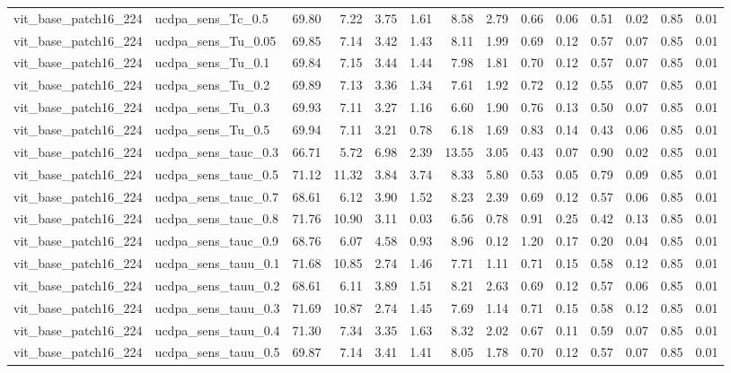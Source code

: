 \begin{tabular}{llrrrrrrrrrrrr}
vit_base_patch16_224 & ucdpa_sens_Tc_0.5 & 69.80 & 7.22 & 3.75 & 1.61 & 8.58 & 2.79 & 0.66 & 0.06 & 0.51 & 0.02 & 0.85 & 0.01 \\
vit_base_patch16_224 & ucdpa_sens_Tu_0.05 & 69.85 & 7.14 & 3.42 & 1.43 & 8.11 & 1.99 & 0.69 & 0.12 & 0.57 & 0.07 & 0.85 & 0.01 \\
vit_base_patch16_224 & ucdpa_sens_Tu_0.1 & 69.84 & 7.15 & 3.44 & 1.44 & 7.98 & 1.81 & 0.70 & 0.12 & 0.57 & 0.07 & 0.85 & 0.01 \\
vit_base_patch16_224 & ucdpa_sens_Tu_0.2 & 69.89 & 7.13 & 3.36 & 1.34 & 7.61 & 1.92 & 0.72 & 0.12 & 0.55 & 0.07 & 0.85 & 0.01 \\
vit_base_patch16_224 & ucdpa_sens_Tu_0.3 & 69.93 & 7.11 & 3.27 & 1.16 & 6.60 & 1.90 & 0.76 & 0.13 & 0.50 & 0.07 & 0.85 & 0.01 \\
vit_base_patch16_224 & ucdpa_sens_Tu_0.5 & 69.94 & 7.11 & 3.21 & 0.78 & 6.18 & 1.69 & 0.83 & 0.14 & 0.43 & 0.06 & 0.85 & 0.01 \\
vit_base_patch16_224 & ucdpa_sens_tauc_0.3 & 66.71 & 5.72 & 6.98 & 2.39 & 13.55 & 3.05 & 0.43 & 0.07 & 0.90 & 0.02 & 0.85 & 0.01 \\
vit_base_patch16_224 & ucdpa_sens_tauc_0.5 & 71.12 & 11.32 & 3.84 & 3.74 & 8.33 & 5.80 & 0.53 & 0.05 & 0.79 & 0.09 & 0.85 & 0.01 \\
vit_base_patch16_224 & ucdpa_sens_tauc_0.7 & 68.61 & 6.12 & 3.90 & 1.52 & 8.23 & 2.39 & 0.69 & 0.12 & 0.57 & 0.06 & 0.85 & 0.01 \\
vit_base_patch16_224 & ucdpa_sens_tauc_0.8 & 71.76 & 10.90 & 3.11 & 0.03 & 6.56 & 0.78 & 0.91 & 0.25 & 0.42 & 0.13 & 0.85 & 0.01 \\
vit_base_patch16_224 & ucdpa_sens_tauc_0.9 & 68.76 & 6.07 & 4.58 & 0.93 & 8.96 & 0.12 & 1.20 & 0.17 & 0.20 & 0.04 & 0.85 & 0.01 \\
vit_base_patch16_224 & ucdpa_sens_tauu_0.1 & 71.68 & 10.85 & 2.74 & 1.46 & 7.71 & 1.11 & 0.71 & 0.15 & 0.58 & 0.12 & 0.85 & 0.01 \\
vit_base_patch16_224 & ucdpa_sens_tauu_0.2 & 68.61 & 6.11 & 3.89 & 1.51 & 8.21 & 2.63 & 0.69 & 0.12 & 0.57 & 0.06 & 0.85 & 0.01 \\
vit_base_patch16_224 & ucdpa_sens_tauu_0.3 & 71.69 & 10.87 & 2.74 & 1.45 & 7.69 & 1.14 & 0.71 & 0.15 & 0.58 & 0.12 & 0.85 & 0.01 \\
vit_base_patch16_224 & ucdpa_sens_tauu_0.4 & 71.30 & 7.34 & 3.35 & 1.63 & 8.32 & 2.02 & 0.67 & 0.11 & 0.59 & 0.07 & 0.85 & 0.01 \\
vit_base_patch16_224 & ucdpa_sens_tauu_0.5 & 69.87 & 7.14 & 3.41 & 1.41 & 8.05 & 1.78 & 0.70 & 0.12 & 0.57 & 0.07 & 0.85 & 0.01 \\
\bottomrule
\end{tabular}
